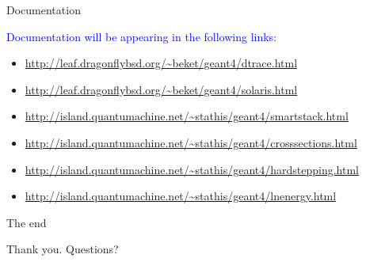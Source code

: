 \documentclass{beamer}
\begin{document}
\def\UrlFont{\scriptsize\ttfamily}
\begin{frame}{Documentation}

\textcolor{blue}{Documentation will be appearing in the following links:}

\begin{itemize}
\item \url{http://leaf.dragonflybsd.org/~beket/geant4/dtrace.html}
\item \url{http://leaf.dragonflybsd.org/~beket/geant4/solaris.html}
\end{itemize}

\vspace{5mm}

\begin{itemize}
\item \url{http://island.quantumachine.net/~stathis/geant4/smartstack.html}
\item \url{http://island.quantumachine.net/~stathis/geant4/crosssections.html}
\item \url{http://island.quantumachine.net/~stathis/geant4/hardstepping.html}
\item \url{http://island.quantumachine.net/~stathis/geant4/lnenergy.html}
\end{itemize}
\end{frame}

\begin{frame}{The end}
\vspace*{\fill}
\begin{center}
Thank you. Questions?
\end{center}
\vspace*{\fill}
\end{frame}
\end{document}
